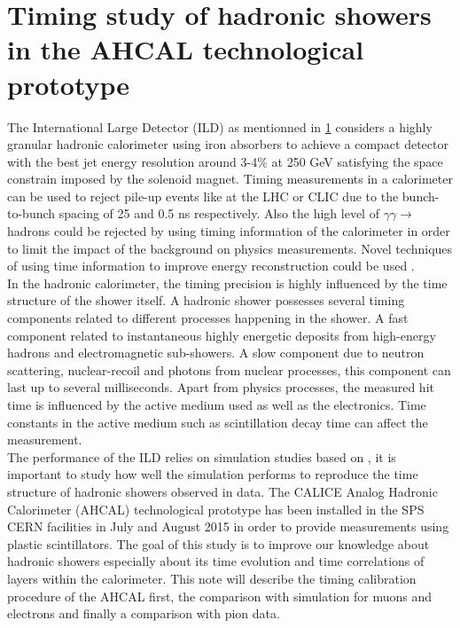 \chapter{Timing study of hadronic showers in the AHCAL technological prototype}

The International Large Detector (ILD) as mentionned in \ref{} considers a highly granular hadronic calorimeter using iron absorbers to achieve a compact detector with the best jet energy resolution around 3-4\% at 250 GeV satisfying the space constrain imposed by the solenoid magnet. Timing measurements in a calorimeter can be used to reject pile-up events like at the LHC or CLIC due to the bunch-to-bunch spacing of 25 and 0.5 ns respectively. Also the high level of $\gamma\gamma \rightarrow$ hadrons could be rejected by using timing information of the calorimeter in order to limit the impact of the background on physics measurements. Novel techniques of using time information to improve energy reconstruction could be used \cite{Benaglia2016}.\\

In the hadronic calorimeter, the timing precision is highly influenced by the time structure of the shower itself. A hadronic shower possesses several timing components related to different processes happening in the shower. A fast component related to instantaneous highly energetic deposits from high-energy hadrons and electromagnetic sub-showers. A slow component due to neutron scattering, nuclear-recoil and photons from nuclear processes, this component can last up to several milliseconds. Apart from physics processes, the measured hit time is influenced by the active medium used as well as the electronics. Time constants in the active medium such as scintillation decay time can affect the measurement.\\

The performance of the ILD relies on simulation studies based on \geant, it is important to study how well the simulation performs to reproduce the time structure of hadronic showers observed in data. The CALICE Analog Hadronic Calorimeter (AHCAL) technological prototype has been installed in the SPS CERN facilities in July and August 2015 in order to provide measurements using plastic scintillators. The goal of this study is to improve our knowledge about hadronic showers especially about its time evolution and time correlations of layers within the calorimeter. This note will describe the timing calibration procedure of the AHCAL first, the comparison with simulation for muons and electrons and finally a comparison with pion data.

